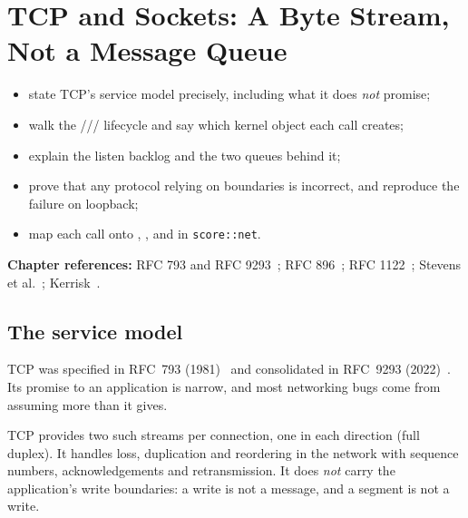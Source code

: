 \chapter{TCP and Sockets: A Byte Stream, Not a Message Queue}\label{ch:tcp}

\begin{objectives}
\begin{itemize}
\item state TCP's service model precisely, including what it does \emph{not} promise;
\item walk the /// lifecycle and say which kernel object each call creates;
\item explain the listen backlog and the two queues behind it;
\item prove that any protocol relying on  boundaries is incorrect, and reproduce the failure on loopback;
\item map each call onto , , and  in \texttt{score::net}.
\end{itemize}
{\small\color{muted}\textbf{Chapter references:} RFC 793 and RFC 9293~\cite{rfc793,rfc9293}; RFC 896~\cite{rfc896}; RFC 1122~\cite{rfc1122};
Stevens et al.~\cite{stevens2004unp}; Kerrisk~\cite{kerrisk2010tlpi}.}
\end{objectives}

\section{The service model}
TCP was specified in RFC~793 (1981)~\cite{rfc793} and consolidated in RFC~9293 (2022)~\cite{rfc9293}. Its promise to an
application is narrow, and most networking bugs come from assuming more than it gives.


TCP provides two such streams per connection, one in each direction (full duplex). It handles loss, duplication and
reordering in the network with sequence numbers, acknowledgements and retransmission. It does \emph{not} carry the
application's write boundaries: a write is not a message, and a segment is not a write.


